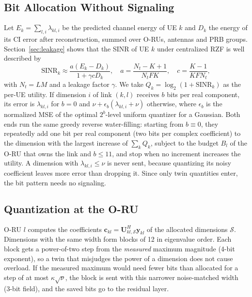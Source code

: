 \documentclass[journal]{IEEEtran}
\newcommand{\vect}[1]{\mathbf{#1}}
\begin{document}
\subsection{Bit Allocation Without Signaling}
Let $E_k=\sum_{l,i}\lambda_{kl,i}$ be the predicted channel energy of UE $k$ and $D_k$ the energy of its CI error after reconstruction, summed over O-RUs, antennas and PRB groups. Section~\ref{sec:leakage} shows that the SINR of UE $k$ under centralized RZF is well described by
\begin{equation}\label{eq:proxy}
\mathrm{SINR}_k\approx\frac{a(E_k-D_k)}{1+\gamma c D_k},\quad a=\frac{N_t-K+1}{N_tFK},\quad c=\frac{K-1}{KFN_t},
\end{equation}
with $N_t=LM$ and a leakage factor $\gamma$. We take $Q_k=\log_2(1+\mathrm{SINR}_k)$ as the per-UE utility. If dimension $i$ of link $(k,l)$ receives $b$ bits per real component, its error is $\lambda_{kl,i}$ for $b=0$ and $\nu+\epsilon_b(\lambda_{kl,i}+\nu)$ otherwise, where $\epsilon_b$ is the normalized MSE of the optimal $2^b$-level uniform quantizer for a Gaussian. Both ends run the same greedy reverse water-filling: starting from $b\equiv0$, they repeatedly add one bit per real component (two bits per complex coefficient) to the dimension with the largest increase of $\sum_kQ_k$, subject to the budget $B_l$ of the O-RU that owns the link and $b\le11$, and stop when no increment increases the utility. A dimension with $\lambda_{kl,i}\le\nu$ is never sent, because quantizing its noisy coefficient leaves more error than dropping it. Since only twin quantities enter, the bit pattern needs no signaling.

\subsection{Quantization at the O-RU}
O-RU $l$ computes the coefficients $\vect{c}_{kl}=\vect{U}_{kl,\mathcal{S}}^{H}\vect{y}_{kl}$ of the allocated dimensions $\mathcal{S}$. Dimensions with the same width form blocks of 12 in eigenvalue order. Each block gets a power-of-two step from the \emph{measured} maximum magnitude (4-bit exponent), so a twin that misjudges the power of a dimension does not cause overload. If the measured maximum would need fewer bits than allocated for a step of at most $\kappa\sqrt{\nu}$, the block is sent with this narrower noise-matched width (3-bit field), and the saved bits go to the residual layer.
\end{document}
